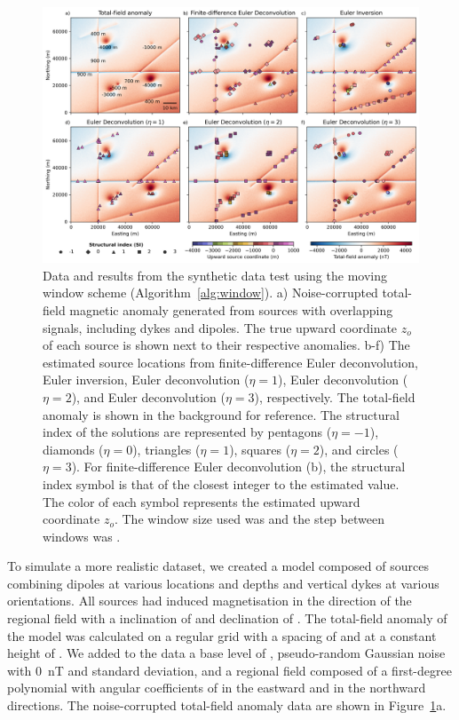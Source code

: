 \begin{figure}[tb!]
\centering
\includegraphics[width=1\linewidth]{euler-inversion/figures/synthetic-windows.png}
\caption{
    Data and results from the synthetic data test using the moving window
    scheme (Algorithm~\ref{alg:window}).
    a) Noise-corrupted total-field magnetic anomaly generated from
    \SynWinNSources{} sources with overlapping signals, including dykes and
    dipoles. The true upward coordinate $z_o$ of each source is shown next to
    their respective anomalies.
    b-f) The estimated source locations from finite-difference Euler
    deconvolution, Euler inversion, Euler deconvolution ($\eta=1$), Euler
    deconvolution ($\eta=2$), and Euler deconvolution ($\eta=3$), respectively.
    The total-field anomaly is shown in the background for reference.
    The structural index of the solutions are represented by pentagons
    ($\eta=-1$),  diamonds ($\eta=0$),  triangles ($\eta=1$),  squares
    ($\eta=2$), and circles ($\eta=3$).
    For finite-difference Euler deconvolution (b), the structural index symbol
    is that of the closest integer to the estimated value.
    The color of each symbol represents the estimated upward coordinate $z_o$.
    The window size used was \SynWinWindowSize{} and the step between windows
    was \SynWinWindowStep{}.
}
\label{fig:windows}
\end{figure}

To simulate a more realistic dataset, we created a model composed of
\SynWinNSources{} sources combining dipoles at various locations and depths and
vertical dykes at various orientations.
All sources had induced magnetisation in the direction of the regional field
with a inclination of \SynWinInc{} and declination of \SynWinDec{}.
The total-field anomaly of the model was calculated on a regular grid with
a spacing of \SynWinSpacing{} and at a constant height of \SynWinHeight{}.
We added to the data a base level of \SynWinBase{}, pseudo-random Gaussian
noise with \qty{0}{\nano\tesla} and \SynWinNoise{} standard deviation, and
a regional field composed of a first-degree polynomial with angular
coefficients of \SynWinRegionalE{} in the eastward and \SynWinRegionalN{} in
the northward directions.
The noise-corrupted total-field anomaly data are shown in
Figure~\ref{fig:windows}a.

